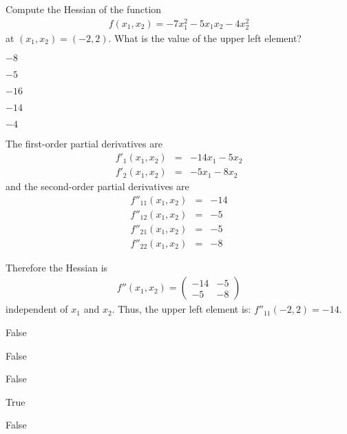 
\begin{question}
Compute the Hessian of the function
\begin{eqnarray*}
  f(x_1, x_2) = -7 x_1^{2}  -5  x_1  x_2  -4  x_2^{2}
\end{eqnarray*}
at $(x_1, x_2) = (-2, 2)$.
What is the value of the upper left element?

\begin{answerlist}
  \item $-8$
  \item $-5$
  \item $-16$
  \item $-14$
  \item $-4$
\end{answerlist}\end{question}

\begin{solution}
The first-order partial derivatives are 
\begin{eqnarray*}
  f'_1(x_1, x_2) &=& -14 x_1  -5 x_2  \\
  f'_2(x_1, x_2) &=& -5 x_1  -8 x_2
\end{eqnarray*}
and the second-order partial derivatives are
\begin{eqnarray*}
  f''_{11}(x_1, x_2) &=& -14\\
  f''_{12}(x_1, x_2) &=& -5\\
  f''_{21}(x_1, x_2) &=& -5\\
  f''_{22}(x_1, x_2) &=& -8
\end{eqnarray*}

Therefore the Hessian is
\begin{eqnarray*}
  f''(x_1, x_2) = \left( \begin{array}{rr} -14 &  -5 \\  -5 &  -8 \end{array} \right)
\end{eqnarray*}
independent of $x_1$ and $x_2$. Thus, the upper left element is:
$f''_{11}(-2, 2) = -14$.


\begin{answerlist}
  \item False
  \item False
  \item False
  \item True
  \item False
\end{answerlist}
\end{solution}

